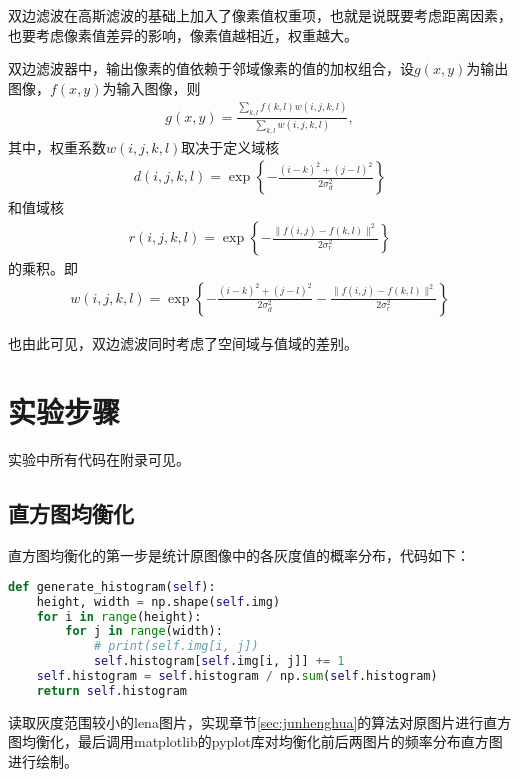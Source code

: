 \documentclass{hitreport}
\begin{document}
双边滤波在高斯滤波的基础上加入了像素值权重项，也就是说既要考虑距离因素，也要考虑像素值差异的影响，像素值越相近，权重越大。

双边滤波器中，输出像素的值依赖于邻域像素的值的加权组合，设$g\left(x,y\right)$为输出图像，$f\left(x,y\right)$为输入图像，则
\begin{align}
g\left(x,y\right) = \frac{\sum_{k,l} f\left(k,l\right)w\left(i,j,k,l\right)}{\sum_{k,l}w\left(i,j,k,l\right)},
\end{align}
其中，权重系数$w\left(i,j,k,l\right)$取决于定义域核
\begin{align}
d\left(i,j,k,l\right) = \exp \left\{-\frac{\left(i-k\right)^2+\left(j-l\right)^2}{2\sigma_d^2}\right\}
\end{align}
和值域核
\begin{align}
r\left(i,j,k,l\right) = \exp \left\{-\frac{\lVert f\left(i,j\right) - f\left(k,l\right) \rVert^2}{2\sigma_r^2}\right\}
\end{align}
的乘积。即
\begin{align}
w\left(i,j,k,l\right) = \exp \left\{-\frac{\left(i-k\right)^2+\left(j-l\right)^2}{2\sigma_d^2}-\frac{\lVert f\left(i,j\right) - f\left(k,l\right) \rVert^2}{2\sigma_r^2}\right\}
\end{align}

也由此可见，双边滤波同时考虑了空间域与值域的差别。

\section{实验步骤}

实验中所有代码在附录可见。

\subsection{直方图均衡化}\label{sec:junhenghua1}

直方图均衡化的第一步是统计原图像中的各灰度值的概率分布，代码如下：
\begin{lstlisting}[language=python]
def generate_histogram(self):
    height, width = np.shape(self.img)
    for i in range(height):
        for j in range(width):
            # print(self.img[i, j])
            self.histogram[self.img[i, j]] += 1
    self.histogram = self.histogram / np.sum(self.histogram)
    return self.histogram
\end{lstlisting}

读取灰度范围较小的lena图片，实现章节\ref{sec:junhenghua}的算法对原图片进行直方图均衡化，最后调用matplotlib的pyplot库对均衡化前后两图片的频率分布直方图进行绘制。
\end{document}
